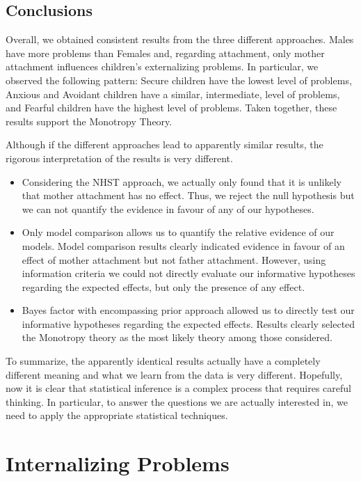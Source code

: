 \documentclass[
]{book}
\providecommand{\tightlist}{%
  \setlength{\itemsep}{0pt}\setlength{\parskip}{0pt}}
\begin{document}
\hypertarget{conclusion-ext}{%
\chapter{Conclusions}\label{conclusion-ext}}

Overall, we obtained consistent results from the three different approaches. Males have more problems than Females and, regarding attachment, only mother attachment influences children's externalizing problems. In particular, we observed the following pattern: Secure children have the lowest level of problems, Anxious and Avoidant children have a similar, intermediate, level of problems, and Fearful children have the highest level of problems. Taken together, these results support the Monotropy Theory.

Although if the different approaches lead to apparently similar results, the rigorous interpretation of the results is very different.

\begin{itemize}
\tightlist
\item
  Considering the NHST approach, we actually only found that it is unlikely that mother attachment has no effect. Thus, we reject the null hypothesis but we can not quantify the evidence in favour of any of our hypotheses.
\item
  Only model comparison allows us to quantify the relative evidence of our models. Model comparison results clearly indicated evidence in favour of an effect of mother attachment but not father attachment. However, using information criteria we could not directly evaluate our informative hypotheses regarding the expected effects, but only the presence of any effect.
\item
  Bayes factor with encompassing prior approach allowed us to directly test our informative hypotheses regarding the expected effects. Results clearly selected the Monotropy theory as the most likely theory among those considered.
\end{itemize}

To summarize, the apparently identical results actually have a completely different meaning and what we learn from the data is very different. Hopefully, now it is clear that statistical inference is a complex process that requires careful thinking. In particular, to answer the questions we are actually interested in, we need to apply the appropriate statistical techniques.

\hypertarget{part-internalizing-problems}{%
\part*{Internalizing Problems}\label{part-internalizing-problems}}
\end{document}
